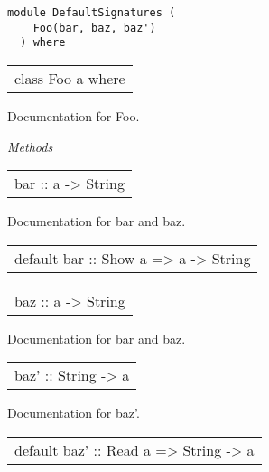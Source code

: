 \label{module:DefaultSignatures}
\haddockbeginheader
{\haddockverb\begin{verbatim}
module DefaultSignatures (
    Foo(bar, baz, baz')
  ) where\end{verbatim}}
\haddockendheader

\begin{haddockdesc}
\item[\begin{tabular}{@{}l}
class Foo a where
\end{tabular}]
{\haddockbegindoc
Documentation for Foo.\par
\haddockpremethods{}\emph{Methods}
\begin{haddockdesc}
\item[\begin{tabular}{@{}l}
bar :: a -> String
\end{tabular}]
{\haddockbegindoc
Documentation for bar and baz.\par}
\end{haddockdesc}
\begin{haddockdesc}
\item[\begin{tabular}{@{}l}
default bar :: Show a => a -> String
\end{tabular}]
\end{haddockdesc}
\begin{haddockdesc}
\item[\begin{tabular}{@{}l}
baz :: a -> String
\end{tabular}]
{\haddockbegindoc
Documentation for bar and baz.\par}
\end{haddockdesc}
\begin{haddockdesc}
\item[\begin{tabular}{@{}l}
baz' :: String -> a
\end{tabular}]
{\haddockbegindoc
Documentation for baz'.\par}
\end{haddockdesc}
\begin{haddockdesc}
\item[\begin{tabular}{@{}l}
default baz' :: Read a => String -> a
\end{tabular}]
\end{haddockdesc}}
\end{haddockdesc}